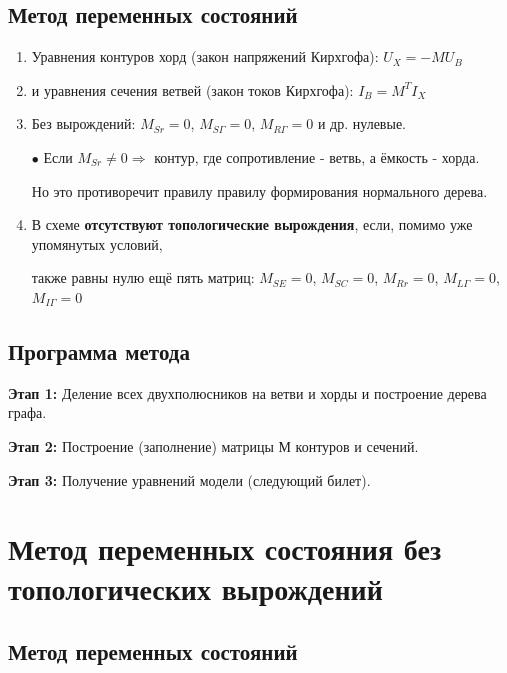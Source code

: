 	\subsection{Метод переменных состояний}
	\begin{enumerate}
		\item Уравнения контуров хорд (закон напряжений Кирхгофа): $U_X = -M U_B$
		\vspace{-0.5em}
		\item и уравнения сечения ветвей (закон токов Кирхгофа): $I_B = M^T I_X$
		\vspace{-0.5em}
		\item Без вырождений: $M_{Sr} = 0$, $M_{S\Gamma} = 0$, $M_{R\Gamma} = 0$ и др. нулевые.
		\par
		$\bullet$ Если $M_{Sr} \neq 0 \Rightarrow$ контур, где сопротивление - ветвь, а ёмкость - хорда. 
		\par
		Но это противоречит правилу правилу формирования нормального дерева.
		\vspace{-0.5em}
		\item В схеме \textbf{отсутствуют топологические вырождения}, если, помимо уже упомянутых условий, 
		\par
		также равны нулю ещё пять матриц: $M_{SE} = 0$, $M_{SC} = 0$, $M_{Rr} = 0$, $M_{L\Gamma} = 0$, $M_{I\Gamma} = 0$
	\end{enumerate}
	\vspace{-2em}
	\subsection{Программа метода}
	\textbf{Этап 1:} Деление всех двухполюсников на ветви и хорды и построение дерева графа.
	\par
	\textbf{Этап 2:} Построение (заполнение) матрицы М контуров и сечений.
	\par
	\textbf{Этап 3:} Получение уравнений модели (следующий билет).
	
	\newpage
	
	\section{Метод переменных состояния без топологических вырождений}
	
	\subsection{Метод переменных состояний}
	

